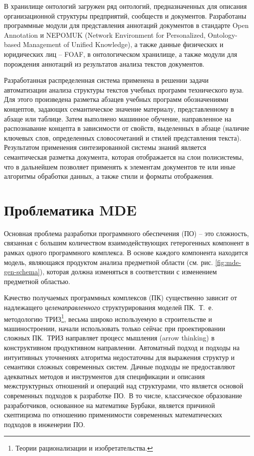 \documentclass[12pt,a4paper]{ltxdoc}
\begin{document}
В хранилище онтологий загружен ряд онтологий, предназначенных для описания организационной структуры предприятий, сообществ и документов. Разработаны программные модули для представления аннотаций документов в стандарте Open Annotation и NEPOMUK (Network Environment for Personalized, Ontology-based Management of Unified Knowledge), а также данные физических и юридических лиц -- FOAF, в онтологическом хранилище, а также модули для порождения аннотаций из результатов анализа текстов документов.

Разработанная распределенная система применена в решении задачи автоматизации анализа структуры текстов учебных программ технического вуза. Для этого произведена разметка абзацев учебных программ обозначениями концептов, задающих семантическое значение материалу, представленному в абзаце или таблице. Затем выполнено машинное обучение, направленное на распознавание концепта в зависимости от свойств, выделенных в абзаце (наличие ключевых слов, определенных словосочетаний и стилей представления текста). Результатом применения синтезированной системы знаний является семантическая разметка документа, которая отображается на слои полисистемы, что в дальнейшем позволяет применять к элементам документов те или иные алгоритмы обработки данных, а также стили и форматы отображения.



\section{Проблематика MDE}
\label{sec:problem-mde}

Основная проблема разработки программного обеспечения (ПО) -- это сложность, связанная с большим количеством взаимодействующих гетерогенных компонент в рамках одного программного комплекса.  В основе каждого компонента находится модель, являющаяся продуктом анализа предметной области (см. рис.  \ref{fig:mde-gen-schema}), которая должна изменяться в соответствии с изменением предметной областью.

Качество получаемых программных комплексов (ПК) существенно зависит от надлежащего \emph{целенаправленного} структурирования моделей ПК.~Т.~е.  методологию ТРИЗ\footnote{Теории рационализации и изобретательства.}, весьма широко используемую в строительстве и машиностроении, начали использовать только сейчас при проектировании сложных ПК.~ТРИЗ направляет процесс мышления (arrow thinking) в конструктивном продуктивном направлении. Автоматный подход и подходы на интуитивных уточнениях алгоритма недостаточны для выражения структур и семантики сложных современных систем. Дачные подходы не предоставляют адекватных методов и инструментов для спецификации и описания межструктурных отношений и операций над структурами, что является основой современных подходов к разработке ПО.~В то числе, классическое образование разработчиков, основанное на математике Бурбаки, является причиной скептицизма по отношению применимости современных математических подходов в инженерии ПО.
\end{document}
